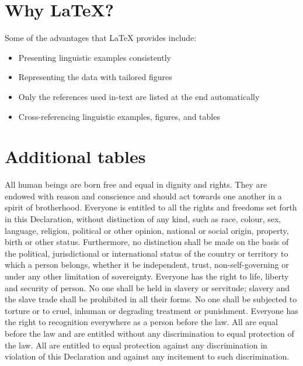 \section{Why {\LaTeX}?}

Some of the advantages that {\LaTeX} provides include:

\begin{itemize}
    \item Presenting linguistic examples consistently
    \item Representing the data with tailored figures 
    \item Only the references used in-text are listed at the end automatically
    \item Cross-referencing linguistic examples, figures, and tables 
\end{itemize}

\section{Additional tables}
All human beings are born free and equal in dignity and rights. They are endowed with reason and conscience and should act towards one another in a spirit of brotherhood. Everyone is entitled to all the rights and freedoms set forth in this Declaration, without distinction of any kind, such as race, colour, sex, language, religion, political or other opinion, national or social origin, property, birth or other status. Furthermore, no distinction shall be made on the basis of the political, jurisdictional or international status of the country or territory to which a person belongs, whether it be independent, trust, non-self-governing or under any other limitation of sovereignty. Everyone has the right to life, liberty and security of person. No one shall be held in slavery or servitude; slavery and the slave trade shall be prohibited in all their forms. No one shall be subjected to torture or to cruel, inhuman or degrading treatment or punishment. Everyone has the right to recognition everywhere as a person before the law. All are equal before the law and are entitled without any discrimination to equal protection of the law. All are entitled to equal protection against any discrimination in violation of this Declaration and against any incitement to such discrimination.

